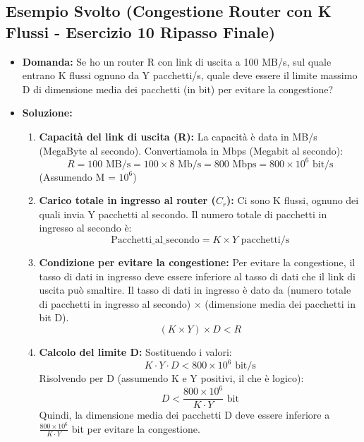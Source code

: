 \subsection{Esempio Svolto (Congestione Router con K Flussi - Esercizio 10 Ripasso Finale)}
\begin{itemize}
    \item \textbf{Domanda:} Se ho un router R con link di uscita a 100 MB/s, sul quale entrano K flussi ognuno da Y pacchetti/s, quale deve essere il limite massimo D di dimensione media dei pacchetti (in bit) per evitare la congestione?
    \item \textbf{Soluzione:}
    \begin{enumerate}
        \item \textbf{Capacità del link di uscita (R):}
        La capacità è data in MB/s (MegaByte al secondo). Convertiamola in Mbps (Megabit al secondo):
        \[ R = 100 \text{ MB/s} = 100 \times 8 \text{ Mb/s} = 800 \text{ Mbps} = 800 \times 10^6 \text{ bit/s} \]
        (Assumendo M = $10^6$)
        \item \textbf{Carico totale in ingresso al router ($C_r$):}
        Ci sono K flussi, ognuno dei quali invia Y pacchetti al secondo.
        Il numero totale di pacchetti in ingresso al secondo è:
        \[ \text{Pacchetti\_al\_secondo} = K \times Y \text{ pacchetti/s} \]
        \item \textbf{Condizione per evitare la congestione:}
        Per evitare la congestione, il tasso di dati in ingresso deve essere inferiore al tasso di dati che il link di uscita può smaltire.
        Il tasso di dati in ingresso è dato da (numero totale di pacchetti in ingresso al secondo) $\times$ (dimensione media dei pacchetti in bit D).
        \[ (K \times Y) \times D < R \]
        \item \textbf{Calcolo del limite D:}
        Sostituendo i valori:
        \[ K \cdot Y \cdot D < 800 \times 10^6 \text{ bit/s} \]
        Risolvendo per D (assumendo K e Y positivi, il che è logico):
        \[ D < \frac{800 \times 10^6}{K \cdot Y} \text{ bit} \]
        Quindi, la dimensione media dei pacchetti D deve essere inferiore a $\frac{800 \times 10^6}{K \cdot Y}$ bit per evitare la congestione.
    \end{enumerate}
\end{itemize}


